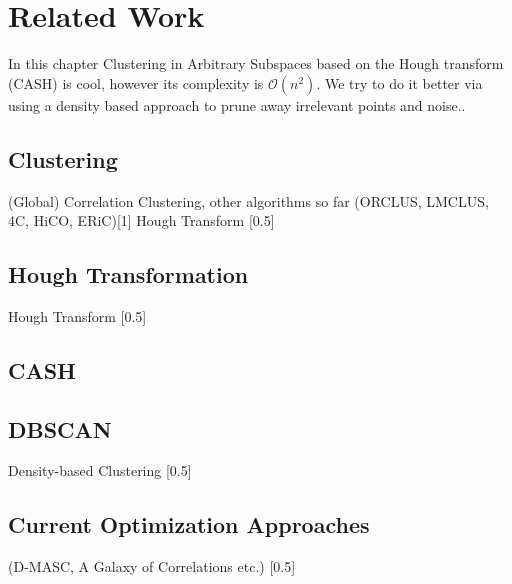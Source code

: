\chapter{Related Work}


In this chapter 
Clustering in Arbitrary Subspaces based on the Hough transform (CASH) is cool, however its complexity is $\mathcal{O}(n^2)$.
We try to do it better via using a density based approach to prune away irrelevant points and noise..
\section{Clustering}
(Global) Correlation Clustering, other algorithms so far (ORCLUS, LMCLUS, 4C, HiCO, ERiC)\cite{10.1007/978-3-030-02224-2_13}[1]
Hough Transform [0.5]

\section{Hough Transformation}
Hough Transform [0.5]

\section{CASH}

\section{DBSCAN}
Density-based Clustering [0.5]


\section{Current Optimization Approaches}
 (D-MASC, A Galaxy of Correlations etc.) [0.5]